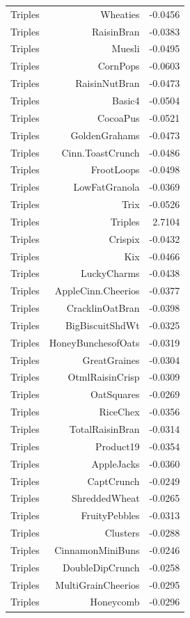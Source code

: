 \begin{longtable}{@{}lrr@{}}
Triples & Wheaties & -0.0456 \\
Triples & RaisinBran & -0.0383 \\
Triples & Muesli & -0.0495 \\
Triples & CornPops & -0.0603 \\
Triples & RaisinNutBran & -0.0473 \\
Triples & Basic4 & -0.0504 \\
Triples & CocoaPus & -0.0521 \\
Triples & GoldenGrahams & -0.0473 \\
Triples & Cinn.ToastCrunch & -0.0486 \\
Triples & FrootLoops & -0.0498 \\
Triples & LowFatGranola & -0.0369 \\
Triples & Trix & -0.0526 \\
Triples & Triples & 2.7104 \\
Triples & Crispix & -0.0432 \\
Triples & Kix & -0.0466 \\
Triples & LuckyCharms & -0.0438 \\
Triples & AppleCinn.Cheerios & -0.0377 \\
Triples & CracklinOatBran & -0.0398 \\
Triples & BigBiscuitShdWt & -0.0325 \\
Triples & HoneyBunchesofOats & -0.0319 \\
Triples & GreatGraines & -0.0304 \\
Triples & OtmlRaisinCrisp & -0.0309 \\
Triples & OatSquares & -0.0269 \\
Triples & RiceChex & -0.0356 \\
Triples & TotalRaisinBran & -0.0314 \\
Triples & Product19 & -0.0354 \\
Triples & AppleJacks & -0.0360 \\
Triples & CaptCrunch & -0.0249 \\
Triples & ShreddedWheat & -0.0265 \\
Triples & FruityPebbles & -0.0313 \\
Triples & Clusters & -0.0288 \\
Triples & CinnamonMiniBuns & -0.0246 \\
Triples & DoubleDipCrunch & -0.0258 \\
Triples & MultiGrainCheerios & -0.0295 \\
Triples & Honeycomb & -0.0296 \\

\end{longtable}
